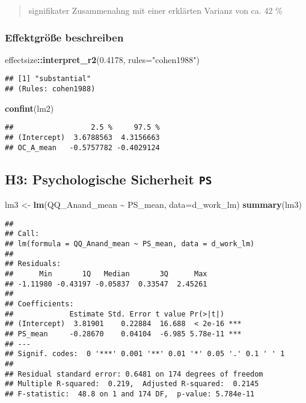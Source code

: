 \documentclass[
]{article}
\newenvironment{Shaded}{\begin{snugshade}}{\end{snugshade}}
\newcommand{\AttributeTok}[1]{\textcolor[rgb]{0.13,0.29,0.53}{#1}}
\newcommand{\FloatTok}[1]{\textcolor[rgb]{0.00,0.00,0.81}{#1}}
\newcommand{\FunctionTok}[1]{\textcolor[rgb]{0.13,0.29,0.53}{\textbf{#1}}}
\newcommand{\NormalTok}[1]{#1}
\newcommand{\OtherTok}[1]{\textcolor[rgb]{0.56,0.35,0.01}{#1}}
\newcommand{\SpecialCharTok}[1]{\textcolor[rgb]{0.81,0.36,0.00}{\textbf{#1}}}
\newcommand{\StringTok}[1]{\textcolor[rgb]{0.31,0.60,0.02}{#1}}
\begin{document}
\begin{quote}
signifikater Zusammenahng mit einer erklärten Varianz von ca. 42 \%
\end{quote}

\subsubsection{Effektgröße
beschreiben}\label{effektgruxf6uxdfe-beschreiben-1}

\begin{Shaded}
\begin{Highlighting}[]
\NormalTok{effectsize}\SpecialCharTok{::}\FunctionTok{interpret\_r2}\NormalTok{(}\FloatTok{0.4178}\NormalTok{, }\AttributeTok{rules=}\StringTok{"cohen1988"}\NormalTok{)}
\end{Highlighting}
\end{Shaded}

\begin{verbatim}
## [1] "substantial"
## (Rules: cohen1988)
\end{verbatim}

\begin{Shaded}
\begin{Highlighting}[]
\FunctionTok{confint}\NormalTok{(lm2)}
\end{Highlighting}
\end{Shaded}

\begin{verbatim}
##                  2.5 %     97.5 %
## (Intercept)  3.6788563  4.3156663
## OC_A_mean   -0.5757782 -0.4029124
\end{verbatim}

\subsection{\texorpdfstring{H3: Psychologische Sicherheit
\texttt{PS}}{H3: Psychologische Sicherheit PS}}\label{h3-psychologische-sicherheit-ps}

\begin{Shaded}
\begin{Highlighting}[]
\NormalTok{lm3 }\OtherTok{\textless{}{-}} \FunctionTok{lm}\NormalTok{(QQ\_Anand\_mean }\SpecialCharTok{\textasciitilde{}}\NormalTok{ PS\_mean, }\AttributeTok{data=}\NormalTok{d\_work\_lm)}
\FunctionTok{summary}\NormalTok{(lm3)}
\end{Highlighting}
\end{Shaded}

\begin{verbatim}
## 
## Call:
## lm(formula = QQ_Anand_mean ~ PS_mean, data = d_work_lm)
## 
## Residuals:
##      Min       1Q   Median       3Q      Max 
## -1.11980 -0.43197 -0.05837  0.33547  2.45261 
## 
## Coefficients:
##             Estimate Std. Error t value Pr(>|t|)    
## (Intercept)  3.81901    0.22884  16.688  < 2e-16 ***
## PS_mean     -0.28670    0.04104  -6.985 5.78e-11 ***
## ---
## Signif. codes:  0 '***' 0.001 '**' 0.01 '*' 0.05 '.' 0.1 ' ' 1
## 
## Residual standard error: 0.6481 on 174 degrees of freedom
## Multiple R-squared:  0.219,  Adjusted R-squared:  0.2145 
## F-statistic:  48.8 on 1 and 174 DF,  p-value: 5.784e-11
\end{verbatim}
\end{document}
